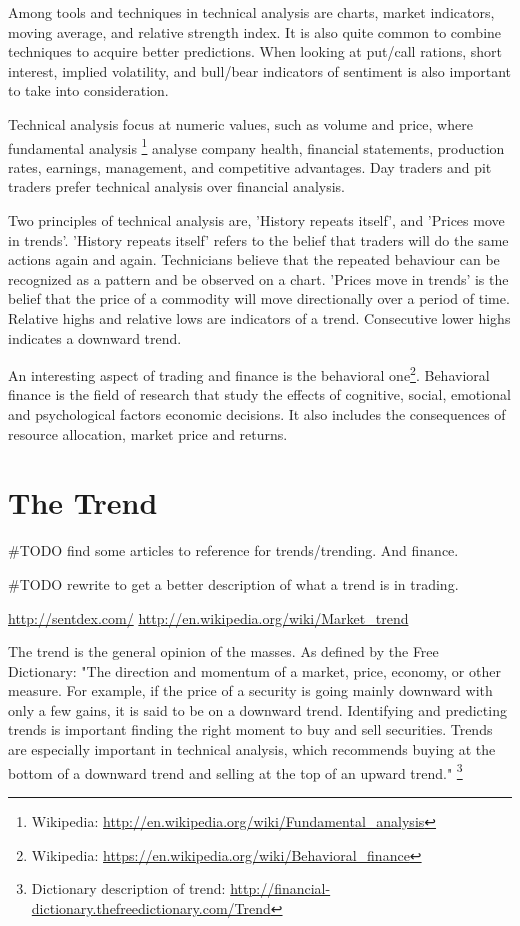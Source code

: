 Among tools and techniques in technical analysis are charts, market indicators,
moving average, and relative strength index. It is also quite common to combine
techniques to acquire better predictions. When looking at put/call rations,
short interest, implied volatility, and bull/bear indicators of sentiment is
also important to take into consideration. 

Technical analysis focus at numeric values, such as volume and price, where fundamental analysis \footnote{Wikipedia:
\url{http://en.wikipedia.org/wiki/Fundamental_analysis}} analyse company health,
financial statements, production rates, earnings, management, and competitive
advantages. Day traders and pit traders prefer technical analysis over
financial analysis.   

Two principles of technical analysis are, 'History repeats itself', and
'Prices move in trends'. 'History repeats itself' refers to the belief that
traders will do the same actions again and again. Technicians believe that the
repeated behaviour can be recognized as a pattern and be observed on a chart.
'Prices move in trends' is the belief that the price of a commodity will move
directionally over a period of time. Relative highs and relative lows are
indicators of a trend. Consecutive lower highs indicates a downward trend.  

An interesting aspect of trading and finance is the behavioral
one\footnote{Wikipedia:
\url{https://en.wikipedia.org/wiki/Behavioral_finance}}.
Behavioral finance is the field of research that study the effects of
cognitive, social, emotional and psychological factors economic decisions. It
also includes the consequences of resource allocation, market price and
returns. 

\section{The Trend}
#TODO find some articles to reference for trends/trending. And finance.   


#TODO rewrite to get a better description of what a trend is in trading.

\url{http://sentdex.com/}
\url{http://en.wikipedia.org/wiki/Market_trend}

The trend is the general opinion of the masses. As defined by the Free
Dictionary:  
"The direction and momentum of a market, price, economy, or other measure. For
example, if the price of a security is going mainly downward with only a few
gains, it is said to be on a downward trend. Identifying and
predicting trends is important finding the right moment to buy and sell
securities. Trends are especially important in technical analysis, which
recommends buying at the bottom of a downward trend and selling at the top of an
upward trend."
\footnote{Dictionary description of trend: \url{http://financial-dictionary.thefreedictionary.com/Trend}}


